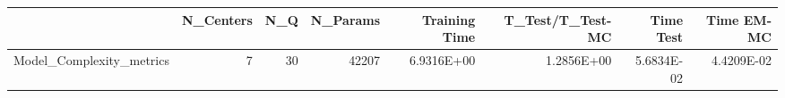 \begin{tabular}{lrrrrrrr}
\toprule
{} &  N\_Centers &  N\_Q &  N\_Params &  Training Time &  T\_Test/T\_Test-MC &  Time Test &  Time EM-MC \\
\midrule
Model\_Complexity\_metrics &          7 &   30 &     42207 &     6.9316E+00 &        1.2856E+00 & 5.6834E-02 &  4.4209E-02 \\
\bottomrule
\end{tabular}
